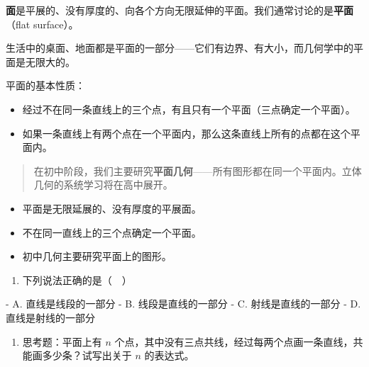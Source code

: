 \begin{understand}


\textbf{面}是平展的、没有厚度的、向各个方向无限延伸的平面。我们通常讨论的是\textbf{平面}（flat surface）。

生活中的桌面、地面都是平面的一部分——它们有边界、有大小，而几何学中的平面是无限大的。

平面的基本性质：
\begin{itemize}
  \item 经过不在同一条直线上的三个点，有且只有一个平面（三点确定一个平面）。
  \item 如果一条直线上有两个点在一个平面内，那么这条直线上所有的点都在这个平面内。
\end{itemize}


\end{understand}

\begin{quote}
在初中阶段，我们主要研究\textbf{平面几何}——所有图形都在同一个平面内。立体几何的系统学习将在高中展开。
\end{quote}


\begin{keytakeaway}


\begin{itemize}
  \item 平面是无限延展的、没有厚度的平展面。
  \item 不在同一直线上的三个点确定一个平面。
  \item 初中几何主要研究平面上的图形。
\end{itemize}


\end{keytakeaway}

\begin{practice}


\begin{enumerate}
  \item 下列说法正确的是（　）
\end{enumerate}

   - A. 直线是线段的一部分
   - B. 线段是直线的一部分
   - C. 射线是直线的一部分
   - D. 直线是射线的一部分

\begin{enumerate}
  \item 思考题：平面上有 $n$ 个点，其中没有三点共线，经过每两个点画一条直线，共能画多少条？试写出关于 $n$ 的表达式。
\end{enumerate}


\end{practice}




